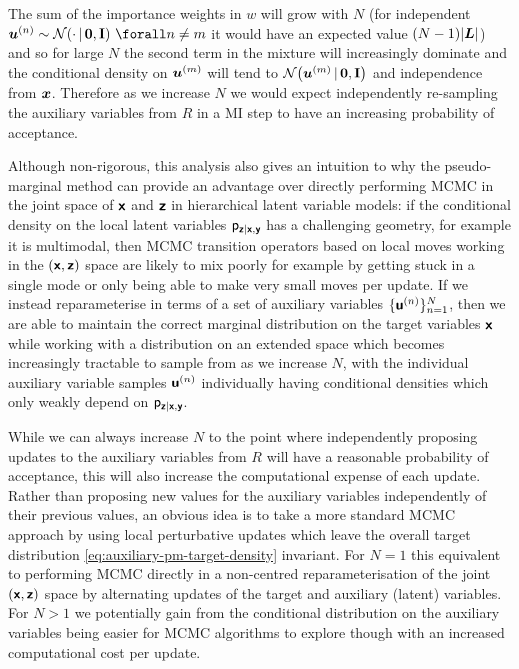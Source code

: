The sum of the importance weights in $w$ will grow with $N$ (for independent $\vct{u}^{(n)} \sim \nrm{\cdot \gvn \vct{0},\mathbf{I}} ~\forall n \neq m$ it would have an expected value $(N-1)|\boldsymbol{L}|$) and so for large $N$ the second term in the mixture will increasingly dominate and the conditional density on $\boldsymbol{u}^{(m)}$ will tend to $\nrm{\vct{u}^{(m)}\gvn\vct{0},\mathbf{I}}$ and independence from $\boldsymbol{x}$. Therefore as we increase $N$ we would expect independently re-sampling the auxiliary variables from $R$ in a \ac{MI} step to have an increasing probability of acceptance.

Although non-rigorous, this analysis also gives an intuition to why the pseudo-marginal method can provide an advantage over directly performing \ac{MCMC} in the joint space of $\boldsymbol{\mathsf{x}}$ and $\boldsymbol{\mathsf{z}}$ in hierarchical latent variable models: if the conditional density on the local latent variables $\mathsf{p}_{\boldsymbol{\mathsf{z}}|\boldsymbol{\mathsf{x}},\boldsymbol{\mathsf{y}}}$ has a challenging geometry, for example it is multimodal, then \ac{MCMC} transition operators based on local moves working in the $(\boldsymbol{\mathsf{x}},\boldsymbol{\mathsf{z}})$ space are likely to mix poorly for example by getting stuck in a single mode or only being able to make very small moves per update. If we instead reparameterise in terms of a set of auxiliary variables $\lbrace \boldsymbol{\mathsf{u}}^{(n)} \rbrace_{n=1}^N$, then we are able to maintain the correct marginal distribution on the target variables $\boldsymbol{\mathsf{x}}$ while working with a distribution on an extended space which becomes increasingly tractable to sample from as we increase $N$, with the individual auxiliary variable samples $\boldsymbol{\mathsf{u}}^{(n)}$ individually having conditional densities which only weakly depend on $\mathsf{p}_{\boldsymbol{\mathsf{z}}|\boldsymbol{\mathsf{x}},\boldsymbol{\mathsf{y}}}$.

While we can always increase $N$ to the point where independently proposing updates to the auxiliary variables from $R$ will have a reasonable probability of acceptance, this will also increase the computational expense of each update. Rather than proposing new values for the auxiliary variables independently of their previous values, an obvious idea is to take a more standard \ac{MCMC} approach by using local perturbative updates which leave the overall target distribution \eqref{eq:auxiliary-pm-target-density} invariant. For $N=1$ this equivalent to performing \ac{MCMC} directly in a non-centred reparameterisation \citep{papaspiliopoulos2003non} of the joint $(\boldsymbol{\mathsf{x}},\boldsymbol{\mathsf{z}})$ space by alternating updates of the target and auxiliary (latent) variables. For $N > 1$ we potentially gain from the conditional distribution on the auxiliary variables being easier for \ac{MCMC} algorithms to explore though with an increased computational cost per update.

